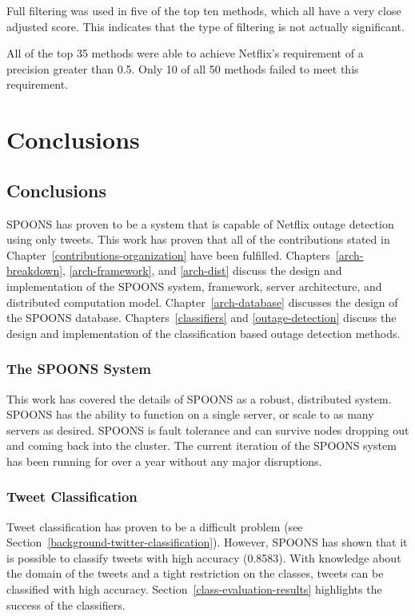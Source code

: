 \documentclass[12pt]{ucthesis}
\begin{document}
Full filtering was used in five of the top ten methods, which all have a very close adjusted score.
This indicates that the type of filtering is not actually significant.

All of the top 35 methods were able to achieve Netflix's requirement of a precision greater than 0.5.
Only 10 of all 50 methods failed to meet this requirement.



\part{Conclusions}
\label{conclusions}

\chapter{Conclusions}
\label{conclusions-conclusions}
SPOONS has proven to be a system that is capable of Netflix outage detection using only tweets.
This work has proven that all of the contributions stated in Chapter~\ref{contributions-organization} have been fulfilled.
Chapters~\ref{arch-breakdown}, \ref{arch-framework}, and \ref{arch-dist} discuss the design and implementation of the SPOONS system, framework, server architecture, and distributed computation model.
Chapter~\ref{arch-database} discusses the design of the SPOONS database.
Chapters~\ref{classifiers} and \ref{outage-detection} discuss the design and implementation of the classification based outage detection methods.

\section{The SPOONS System}
\label{conclusions-conclusions-system}
This work has covered the details of SPOONS as a robust, distributed system.
SPOONS has the ability to function on a single server, or scale to as many servers as desired.
SPOONS is fault tolerance and can survive nodes dropping out and coming back into the cluster.
The current iteration of the SPOONS system has been running for over a year without any major disruptions.

\section{Tweet Classification}
\label{conclusions-conclusions-classification}
Tweet classification has proven to be a difficult problem (see Section~\ref{background-twitter-classification}).
However, SPOONS has shown that it is possible to classify tweets with high accuracy (0.8583).
With knowledge about the domain of the tweets and a tight restriction on the classes, tweets can be classified with high accuracy.
Section~\ref{class-evaluation-results} highlights the success of the classifiers.
\end{document}
